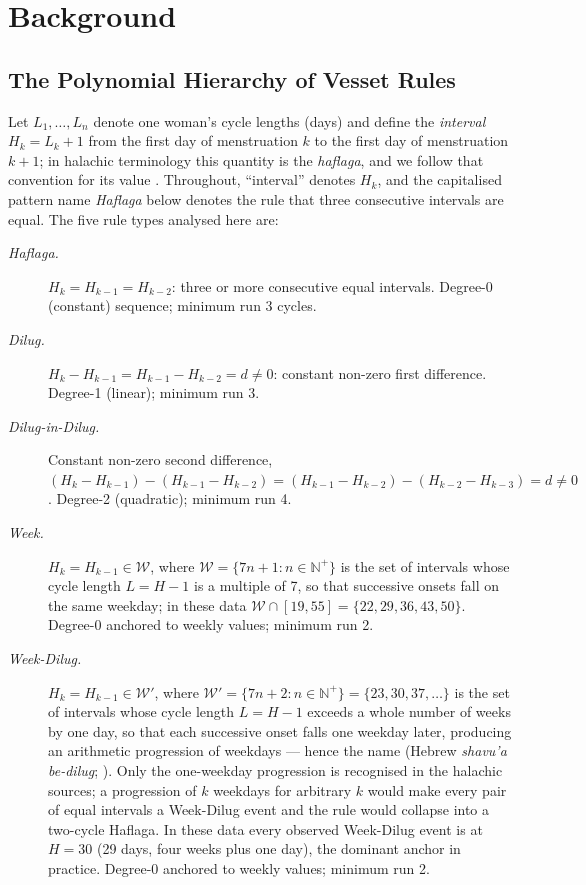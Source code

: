 \documentclass[12pt]{article}
\begin{document}
\section{Background}

\subsection{The Polynomial Hierarchy of Vesset Rules}

Let $L_1, \ldots, L_n$ denote one woman's cycle lengths (days) and define the
\textit{interval} $H_k = L_k + 1$ from the first day of menstruation $k$ to the first
day of menstruation $k+1$; in halachic terminology this quantity is the \textit{haflaga},
and we follow that convention for its value \citep{ross2026statistical}. Throughout,
``interval'' denotes $H_k$, and the capitalised pattern name \textit{Haflaga} below
denotes the rule that three consecutive intervals are equal. The five rule types analysed
here are:

\begin{description}
  \item[\textit{Haflaga.}] $H_k = H_{k-1} = H_{k-2}$: three or more consecutive equal
    intervals. Degree-0 (constant) sequence; minimum run 3 cycles.
  \item[\textit{Dilug.}] $H_k - H_{k-1} = H_{k-1} - H_{k-2} = d \neq 0$: constant
    non-zero first difference. Degree-1 (linear); minimum run 3.
  \item[\textit{Dilug-in-Dilug.}] Constant non-zero second difference,
    $(H_k - H_{k-1}) - (H_{k-1} - H_{k-2}) = (H_{k-1} - H_{k-2}) - (H_{k-2} - H_{k-3})
    = d \neq 0$. Degree-2 (quadratic); minimum run 4.
  \item[\textit{Week.}] $H_k = H_{k-1} \in \mathcal{W}$, where
    $\mathcal{W} = \{7n + 1 : n \in \mathbb{N}^{+}\}$ is the set of intervals
    whose cycle length $L = H - 1$ is a multiple of 7, so that successive onsets fall on
    the same weekday; in these data $\mathcal{W} \cap [19, 55] = \{22, 29, 36, 43,
    50\}$. Degree-0 anchored to weekly values; minimum run 2.
  \item[\textit{Week-Dilug.}] $H_k = H_{k-1} \in \mathcal{W}'$, where
    $\mathcal{W}' = \{7n + 2 : n \in \mathbb{N}^{+}\} = \{23, 30, 37, \ldots\}$ is the
    set of intervals whose cycle length $L = H - 1$ exceeds a whole number of weeks by
    one day, so that each successive onset falls one weekday later, producing an
    arithmetic progression of weekdays --- hence the name (Hebrew \textit{shavu'a
    be-dilug}; \citealp{ross2022phd}). Only the one-weekday progression is recognised in
    the halachic sources; a progression of $k$ weekdays for arbitrary $k$ would make every
    pair of equal intervals a Week-Dilug event and the rule would collapse into a two-cycle
    Haflaga. In these data every observed Week-Dilug event is at $H = 30$ (29 days, four
    weeks plus one day), the dominant anchor in practice. Degree-0 anchored to weekly
    values; minimum run 2.
\end{description}
\end{document}

